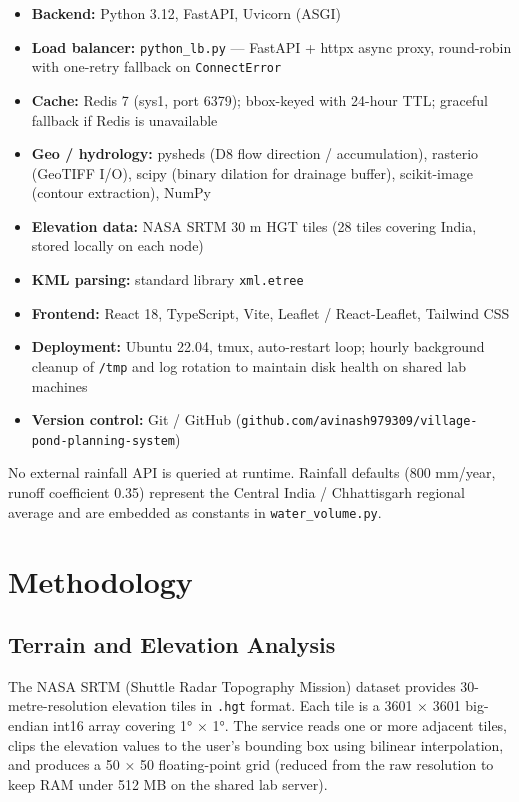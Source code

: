 \documentclass[manuscript,screen,review]{acmart}
\begin{document}
\begin{itemize}
  \item \textbf{Backend:} Python 3.12, FastAPI, Uvicorn (ASGI)
  \item \textbf{Load balancer:} \texttt{python\_lb.py} --- FastAPI +
        httpx async proxy, round-robin with one-retry fallback on
        \texttt{ConnectError}
  \item \textbf{Cache:} Redis 7 (sys1, port 6379); bbox-keyed with
        24-hour TTL; graceful fallback if Redis is unavailable
  \item \textbf{Geo / hydrology:} pysheds (D8 flow direction /
        accumulation), rasterio (GeoTIFF I/O), scipy (binary dilation
        for drainage buffer), scikit-image (contour extraction), NumPy
  \item \textbf{Elevation data:} NASA SRTM 30 m HGT tiles (28 tiles
        covering India, stored locally on each node)
  \item \textbf{KML parsing:} standard library \texttt{xml.etree}
  \item \textbf{Frontend:} React 18, TypeScript, Vite, Leaflet /
        React-Leaflet, Tailwind CSS
  \item \textbf{Deployment:} Ubuntu 22.04, tmux, auto-restart loop;
        hourly background cleanup of \texttt{/tmp} and log rotation
        to maintain disk health on shared lab machines
  \item \textbf{Version control:} Git / GitHub
        (\texttt{github.com/avinash979309/village-pond-planning-system})
\end{itemize}

No external rainfall API is queried at runtime. Rainfall defaults
(800 mm/year, runoff coefficient 0.35) represent the Central India /
Chhattisgarh regional average and are embedded as constants in
\texttt{water\_volume.py}.

\section{Methodology}
\label{sec:methodology}

\subsection{Terrain and Elevation Analysis}

The NASA SRTM (Shuttle Radar Topography Mission) dataset provides
30-metre-resolution elevation tiles in \texttt{.hgt} format. Each
tile is a 3601 × 3601 big-endian int16 array covering 1° × 1°.
The service reads one or more adjacent tiles, clips the elevation
values to the user's bounding box using bilinear interpolation, and
produces a 50 × 50 floating-point grid (reduced from the raw resolution
to keep RAM under 512 MB on the shared lab server).
\end{document}
